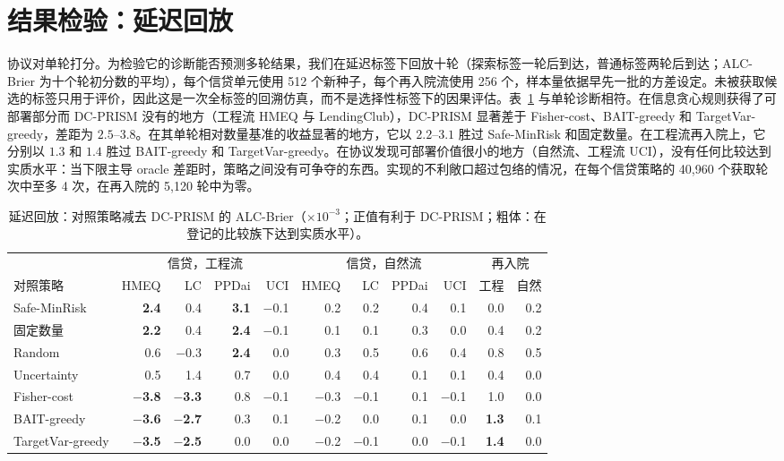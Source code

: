 \documentclass[runningheads]{llncs}
\begin{document}
\section{结果检验：延迟回放}
\label{sec:replay}
协议对单轮打分。为检验它的诊断能否预测多轮结果，我们在延迟标签下回放十轮（探索标签一轮后到达，普通标签两轮后到达；ALC-Brier 为十个轮初分数的平均），每个信贷单元使用 512 个新种子，每个再入院流使用 256 个，样本量依据早先一批的方差设定。未被获取候选的标签只用于评价，因此这是一次全标签的回溯仿真，而不是选择性标签下的因果评估。表~\ref{tab:replay} 与单轮诊断相符。在信息贪心规则获得了可部署部分而 DC-PRISM 没有的地方（工程流 HMEQ 与 LendingClub），DC-PRISM 显著差于 Fisher-cost、BAIT-greedy 和 TargetVar-greedy，差距为 $2.5$--$3.8$。在其单轮相对数量基准的收益显著的地方，它以 $2.2$--$3.1$ 胜过 Safe-MinRisk 和固定数量。在工程流再入院上，它分别以 $1.3$ 和 $1.4$ 胜过 BAIT-greedy 和 TargetVar-greedy。在协议发现可部署价值很小的地方（自然流、工程流 UCI），没有任何比较达到实质水平：当下限主导 oracle 差距时，策略之间没有可争夺的东西。实现的不利敞口超过包络的情况，在每个信贷策略的 40{,}960 个获取轮次中至多 4 次，在再入院的 5{,}120 轮中为零。

\begin{table}[t]
\caption{延迟回放：对照策略减去 DC-PRISM 的 ALC-Brier（$\times10^{-3}$；正值有利于 DC-PRISM；粗体：在登记的比较族下达到实质水平）。}
\label{tab:replay}
\centering\scriptsize
\setlength{\tabcolsep}{2.4pt}
\begin{tabular}{lrrrrrrrrrr}
\toprule
& \multicolumn{4}{c}{信贷，工程流} & \multicolumn{4}{c}{信贷，自然流} & \multicolumn{2}{c}{再入院} \\
\cmidrule(lr){2-5}\cmidrule(lr){6-9}\cmidrule(lr){10-11}
对照策略 & HMEQ & LC & PPDai & UCI & HMEQ & LC & PPDai & UCI & 工程 & 自然 \\
\midrule
Safe-MinRisk & \textbf{2.4} & 0.4 & \textbf{3.1} & $-$0.1 & 0.2 & 0.2 & 0.4 & 0.1 & 0.0 & 0.2 \\
固定数量 & \textbf{2.2} & 0.4 & \textbf{2.4} & $-$0.1 & 0.1 & 0.1 & 0.3 & 0.0 & 0.4 & 0.2 \\
Random & 0.6 & $-$0.3 & \textbf{2.4} & 0.0 & 0.3 & 0.5 & 0.6 & 0.4 & 0.8 & 0.5 \\
Uncertainty & 0.5 & 1.4 & 0.7 & 0.0 & 0.4 & 0.4 & 0.1 & 0.1 & 0.4 & 0.0 \\
Fisher-cost & \textbf{$-$3.8} & \textbf{$-$3.3} & 0.8 & $-$0.1 & $-$0.3 & $-$0.1 & 0.1 & $-$0.1 & 1.0 & 0.0 \\
BAIT-greedy & \textbf{$-$3.6} & \textbf{$-$2.7} & 0.3 & 0.1 & $-$0.2 & 0.0 & 0.1 & 0.0 & \textbf{1.3} & 0.1 \\
TargetVar-greedy & \textbf{$-$3.5} & \textbf{$-$2.5} & 0.0 & 0.0 & $-$0.2 & $-$0.1 & 0.0 & $-$0.1 & \textbf{1.4} & 0.0 \\
\bottomrule
\end{tabular}
\end{table}
\end{document}

